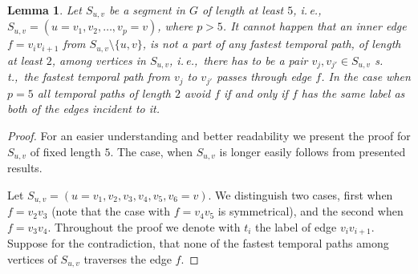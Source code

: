 \documentclass[11pt,a4paper]{article}
\newtheorem{lemma}[theorem]{Lemma}
\theoremstyle{remark}
\theoremstyle{definition}
\newcommand{\ie}{i.\,e.,\ }
\newcommand{\st}{s.\,t.,\ }
\begin{document}
\begin{lemma}\label{lemma:FPT-noUndeterminedEdgeInSegment}
Let $S_{u,v}$ be a segment in $G$ of length at least $5$,
\ie $S_{u,v}= (u=v_1,v_2, \dots, v_p = v)$, where $p > 5$.
It cannot happen that an inner edge $f = v_i v_{i+1}$ from $S_{u,v} \setminus \{u,v\}$,
is not a part of any fastest temporal path, of length at least $2$, among vertices in $S_{u,v}$,
\ie there has to be a pair $v_j, v_{j'} \in S_{u,v}$ \st the fastest temporal path from $v_j$ to $v_{j'}$ passes through edge $f$.
In the case when $p = 5$ all temporal paths of length $2$ avoid $f$ if and only if $f$ has the same label as both of the edges incident to it.
\end{lemma}

\begin{proof}
    For an easier understanding and better readability we present the proof for $S_{u,v}$ of fixed length $5$.
    The case, when $S_{u,v}$ is longer easily follows from presented results.

    Let $S_{u,v} = (u=v_1,v_2, v_3, v_4, v_5, v_6=v)$.
    We distinguish two cases, first when $f = v_2v_3$ (note that the case with $f = v_4v_5$ is symmetrical),
    and the second when  $f = v_3v_4$.
    Throughout the proof we denote with $t_i$ the label of edge $v_i v_{i+1}$.
    Suppose for the contradiction, that none of the fastest temporal paths among vertices of $S_{u,v}$ traverses the edge $f$.


\end{proof}
\end{document}
